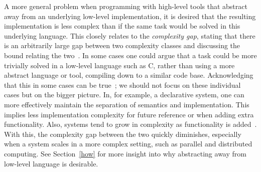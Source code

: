 A more general problem when programming with high-level tools that abstract away from an underlying low-level implementation, it is desired that the resulting implementation is less complex than if the same task would be solved in this underlying language. This closely relates to the \textit{complexity gap}, stating that there is an arbitrarily large gap between two complexity classes and discussing the bound relating the two~\cite{complexityGap}. In some cases one could argue that a task could be more trivially solved in a low-level language such as C, rather than using a more abstract language or tool, compiling down to a similar code base. Acknowledging that this in some cases can be true~\cite{chapel}; we should not focus on these individual cases but on the bigger picture. In, for example, a declarative system, one can more effectively maintain the separation of semantics and implementation. This implies less implementation complexity for future reference or when adding extra functionality. Also, systems tend to grow in complexity as functionality is added~\cite{coordination}. With this, the complexity gap between the two quickly diminishes, especially when a system scales in a more complex setting, such as parallel and distributed computing. See Section~\ref{how} for more insight into why abstracting away from low-level language is desirable.
